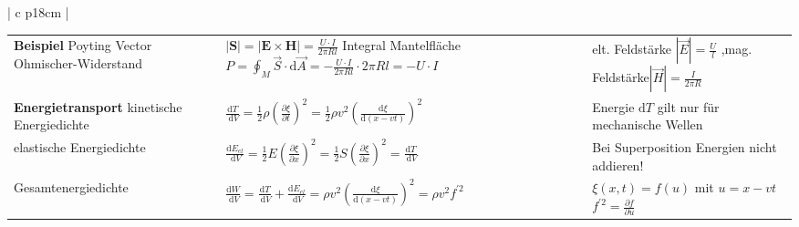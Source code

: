\begin{tabular}{ | c   p{18cm} |}
\begin{tabular}{L{5cm} L{7cm} L{5cm}}
				\rowcolor[rgb]{1,1,1}
				\textbf{Beispiel}  Poyting Vector Ohmischer-Widerstand   &$\displaystyle|\mathbf{S}|=|\mathbf{E} \times \mathbf{H}|=\frac{U \cdot I}{2 \pi R l}$ Integral Mantelfläche
				$\displaystyle P=\oint_{M} \vec{S} \cdot \mathrm{d} \vec{A}=-\frac{U \cdot I}{2 \pi R l} \cdot 2 \pi R l=-U \cdot I$  & elt. Feldstärke $\displaystyle |\vec{E}|=\frac{U}{l}$ ,\qquad mag. Feldstärke$|\displaystyle\vec{H}|=\frac{I}{2 \pi R}$ \\[20pt]

			
			\textbf{Energietransport} \qquad kinetische Energiedichte   & $\displaystyle \frac{\mathrm{d} T}{\mathrm{~d} V}=\frac{1}{2} \rho\left(\frac{\partial \xi}{\partial t}\right)^{2}=\frac{1}{2} \rho v^{2}\left(\frac{\mathrm{d} \xi}{\mathrm{d}(x-v t)}\right)^{2}$& Energie $\mathrm{d} T$ \qquad gilt nur für mechanische Wellen
			\\
			elastische Energiedichte & $\displaystyle \frac{\mathrm{d} E_{e l}}{\mathrm{~d} V}=\frac{1}{2} E\left(\frac{\partial \xi}{\partial x}\right)^{2}=\frac{1}{2} S\left(\frac{\partial \xi}{\partial x}\right)^{2}=\frac{\mathrm{d} T}{\mathrm{~d} V}$& Bei Superposition Energien nicht addieren!\\[5pt]
				
			Gesamtenergiedichte &$\displaystyle \frac{\mathrm{d} W}{\mathrm{~d} V}=\frac{\mathrm{d} T}{\mathrm{~d} V}+\frac{\mathrm{d} E_{e l}}{\mathrm{~d} V}=\rho v^{2}\left(\frac{\mathrm{d} \xi}{\mathrm{d}(x-v t)}\right)^{2}=\rho v^{2} f^{\prime 2}$& $\xi(x, t)=f(u)$ mit  $u=x-v t$\qquad $\displaystyle f^{\prime 2}=\frac{\partial f}{\partial u}$ \\	[20pt]
				
			\end{tabular}\\[5pt]
			\hline
		\end{tabular}
	
